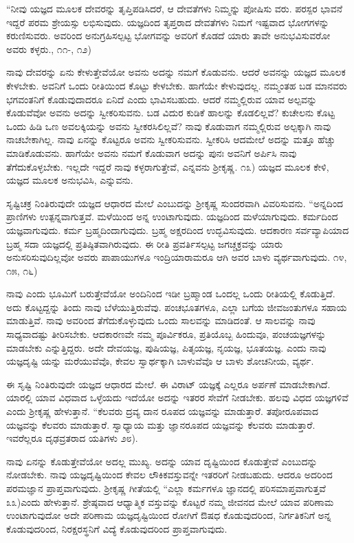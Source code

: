 “ನೀವು ಯಜ್ಞದ ಮೂಲಕ ದೇವರನ್ನು ತೃಪ್ತಿಪಡಿಸಿದರೆ, ಆ ದೇವತೆಗಳು ನಿಮ್ಮನ್ನು ಪೋಷಿಸು ವರು. ಪರಸ್ಪರ ಭಾವನೆ ಇದ್ದರೆ ಪರಮ ಶ್ರೇಯಸ್ಸು ಲಭಿಸುವುದು. ಯಜ್ಞದಿಂದ ತೃಪ್ತರಾದ ದೇವತೆಗಳು ನಿಮಗೆ ಇಷ್ಟವಾದ ಭೋಗಗಳನ್ನು ಕರುಣಿಸುವರು. ಅವರಿಂದ ಅನುಗ್ರಹಿಸಲ್ಪಟ್ಟ ಭೋಗವನ್ನು ಅವರಿಗೆ ಕೊಡದೆ ಯಾರು ತಾವೇ ಅನುಭವಿಸುವರೋ ಅವರು ಕಳ್ಳರು., ೧೧-, ೧೨)

ನಾವು ದೇವರನ್ನು ಏನು ಕೇಳುತ್ತೇವೆಯೋ ಅವನು ಅದನ್ನು ನಮಗೆ ಕೊಡುವನು. ಆದರೆ ಅವನನ್ನು ಯಜ್ಞದ ಮೂಲಕ ಕೇಳಬೇಕು. ಅವನಿಗೆ ಒಂದು ರೀತಿಯಿಂದ ಕೊಟ್ಟು ಕೇಳಬೇಕು. ಹಾಗೆಯೇ ಕೇಳುವುದಲ್ಲ. ನಮ್ಮಂತಹ ಬಡ ಮಾನವರು ಭಗವಂತನಿಗೆ ಕೊಡುವುದಾದರೂ ಏನಿದೆ ಎಂದು ಭಾವಿಸಬಹುದು. ಆದರೆ ನಮ್ಮಲ್ಲಿರುವ ಯಾವ ಅಲ್ಪವನ್ನು ಕೊಡುವೆವೋ ಅವನು ಅದನ್ನು ಸ್ವೀಕರಿಸುವನು. ಬಡ ವಿದುರ ಕುಡಿಕೆ ಹಾಲನ್ನು ಕೊಡಲಿಲ್ಲವೆ? ಕುಚೇಲನು ಕೊಟ್ಟ ಒಂದು ಹಿಡಿ ಒಣ ಅವಲಕ್ಕಿಯನ್ನು ಅವನು ಸ್ವೀಕರಸಿಲಿಲ್ಲವೆ? ನಾವು ಕೊಡುವಾಗ ನಮ್ಮಲ್ಲಿರುವ ಅಲ್ಪಕ್ಕಾಗಿ ನಾವು ನಾಚಬೇಕಾಗಿಲ್ಲ. ನಾವು ಏನನ್ನು ಕೊಟ್ಟರೂ ಅವನು ಸ್ವೀಕರಿಸುವನು. ಸ್ವೀಕರಿಸಿ ಆದಮೇಲೆ ಅದನ್ನು ಮತ್ತೂ ಹೆಚ್ಚು ಮಾಡಿಕೊಡುವನು. ಹಾಗೆಯೇ ಅವನು ನಮಗೆ ಕೊಡುವಾಗ ಅದನ್ನು ಪುನಃ ಅವನಿಗೆ ಅರ್ಪಿಸಿ ನಾವು ತೆಗೆದುಕೊಳ್ಳಬೇಕು. ಇಲ್ಲದೇ ಇದ್ದರೆ ನಾವು ಕಳ್ಳರಾಗುತ್ತೇವೆ, ಎನ್ನವನು ಶ್ರೀಕೃಷ್ಣ. ೧೩) ಯಜ್ಞದ ಮೂಲಕ ಕೇಳಿ, ಯಜ್ಞದ ಮೂಲಕ ಅನುಭವಿಸಿ, ಎನ್ನುವನು.

ಸೃಷ್ಟಿಚಕ್ರ ನಿಂತಿರುವುದೇ ಯಜ್ಞದ ಆಧಾರದ ಮೇಲೆ ಎಂಬುದನ್ನು ಶ್ರೀಕೃಷ್ಣ ಸುಂದರವಾಗಿ ವಿವರಿಸುವನು. “ಅನ್ನದಿಂದ ಪ್ರಾಣಿಗಳು ಉತ್ಪನ್ನವಾಗುತ್ತವೆ. ಮಳೆಯಿಂದ ಅನ್ನ ಉಂಟಾಗುವುದು. ಯಜ್ಞದಿಂದ ಮಳೆಯಾಗುವುದು. ಕರ್ಮದಿಂದ ಯಜ್ಞವಾಗುವುದು. ಕರ್ಮ ಬ್ರಹ್ಮದಿಂದಾಗುವುದು. ಬ್ರಹ್ಮ ಅಕ್ಷರದಿಂದ ಉದ್ಭವಿಸುವುದು. ಆದಕಾರಣ ಸರ್ವವ್ಯಾಪಿಯಾದ ಬ್ರಹ್ಮ ಸದಾ ಯಜ್ಞದಲ್ಲಿ ಪ್ರತಿಷ್ಠಿತವಾಗಿರುವುದು. ಈ ರೀತಿ ಪ್ರವರ್ತಿಸಲ್ಪಟ್ಟ ಜಗಚ್ಚಕ್ರವನ್ನು ಯಾರು ಅನುಸರಿಸುವುದಿಲ್ಲವೋ ಅವರು ಪಾಪಾಯುಗಳೂ ಇಂದ್ರಿಯಾರಾಮರೂ ಆಗಿ ಅವರ ಬಾಳು ವ್ಯರ್ಥವಾಗುವುದು.  ೧೪, ೧೫, ೧೬)

ನಾವು ಎಂದು ಭೂಮಿಗೆ ಬರುತ್ತೇವೆಯೋ ಅಂದಿನಿಂದ ಇಡೀ ಬ್ರಹ್ಮಾಂಡ ಒಂದಲ್ಲ ಒಂದು ರೀತಿಯಲ್ಲಿ ಕೊಡುತ್ತಿದೆ. ಅದು ಕೊಟ್ಟದ್ದನ್ನು ತಿಂದು ನಾವು ಬೆಳೆಯುತ್ತಿರುವೆವು. ಪಂಚಭೂತಗಳೂ, ಎಲ್ಲಾ ಬಗೆಯ ಜೀವಜಂತುಗಳೂ ಸಹಾಯ ಮಾಡುತ್ತಿವೆ. ನಾವು ಅವರಿಂದ ತೆಗೆದುಕೊಳ್ಳುವುದು ಒಂದು ಸಾಲವನ್ನು ಮಾಡಿದಂತೆ. ಆ ಸಾಲವನ್ನು ನಾವು ಸಾಧ್ಯವಾದಷ್ಟು ತೀರಿಸಬೇಕು. ಆದಕಾರಣವೇ ನಮ್ಮ ಪೂರ್ವಿಕರೂ, ಪ್ರತಿಯೊಬ್ಬ ಹಿಂದುವೂ, ಪಂಚಯಜ್ಞಗಳನ್ನು ಮಾಡಬೇಕು ಎನ್ನುತ್ತಿದ್ದರು. ಅದೇ ದೇವಯಜ್ಞ, ಪುಷಿಯಜ್ಞ, ಪಿತೃಯಜ್ಞ, ನೃಯಜ್ಞ, ಭೂತಯಜ್ಞ. ಎಂದು ನಾವು ಯಜ್ಞದೃಷ್ಟಿ ಯನ್ನು ಮರೆಯುವೆವೊ, ಕೇವಲ ಸ್ವಾರ್ಥಕ್ಕಾಗಿ ಬಾಳುವೆವೊ ಆ ಬಾಳು ಶೋಚನೀಯ, ವ್ಯರ್ಥ.

ಈ ಸೃಷ್ಟಿ ನಿಂತಿರುವುದೇ ಯಜ್ಞದ ಆಧಾರದ ಮೇಲೆ. ಈ ವಿರಾಟ್ ಯಜ್ಞಕ್ಕೆ ಎಲ್ಲರೂ ಅರ್ಪಣೆ ಮಾಡಬೇಕಾಗಿದೆ. ಯಾರಲ್ಲಿ ಯಾವ ವಿಧವಾದ ಒಳ್ಳೆಯದು ಇದೆಯೋ ಅದನ್ನು ಇತರರ ಸೇವೆಗೆ ನೀಡಬೇಕು. ಹಲವು ವಿಧದ ಯಜ್ಞಗಳಿವೆ ಎಂದು ಶ್ರೀಕೃಷ್ಣ ಹೇಳುತ್ತಾನೆ. “ಕೆಲವರು ದ್ರವ್ಯ ದಾನ ರೂಪದ ಯಜ್ಞವನ್ನು ಮಾಡುತ್ತಾರೆ. ತಪೋರೂಪವಾದ ಯಜ್ಞವನ್ನು ಕೆಲವರು ಮಾಡುತ್ತಾರೆ. ಸ್ವಾಧ್ಯಾಯ ಮತ್ತು ಜ್ಞಾನರೂಪದ ಯಜ್ಞವನ್ನು ಕೆಲವರು ಮಾಡುತ್ತಾರೆ. ಇವರೆಲ್ಲರೂ ದೃಢವ್ರತರಾದ ಯತಿಗಳು ೨೮).

ನಾವು ಏನನ್ನು ಕೊಡುತ್ತೇವೆಯೋ ಅದಲ್ಲ ಮುಖ್ಯ. ಅದನ್ನು ಯಾವ ದೃಷ್ಟಿಯಿಂದ ಕೊಡುತ್ತೇವೆ ಎಂಬುದನ್ನು ನೋಡಬೇಕು. ನಾವು ಯಜ್ಞದೃಷ್ಟಿಯಿಂದ ಕೇವಲ ಲೌಕಿಕವಸ್ತುವನ್ನೇ ಇತರರಿಗೆ ನೀಡಬಹುದು. ಆದರೂ ಅದರಿಂದ ಪರಮಜ್ಞಾನ ಪ್ರಾಪ್ತವಾಗುವುದು. ಶ್ರೀಕೃಷ್ಣ ಗೀತೆಯಲ್ಲಿ “ಎಲ್ಲಾ ಕರ್ಮಗಳೂ ಜ್ಞಾನದಲ್ಲಿ ಪರಿಸಮಾಪ್ತವಾಗುತ್ತವೆ ೩೩)ಎಂದು ಹೇಳುತ್ತಾನೆ. ಶ್ರೇಷ್ಠವಾದ ಆಧ್ಯಾತ್ಮಿಕ ವಸ್ತುವನ್ನು ಕೊಟ್ಟರೆ ನಮ್ಮ ಜೀವನದ ಮೇಲೆ ಯಾವ ಪರಿಣಾಮ ಉಂಟಾಗುವುದೋ ಅದೇ ಪರಿಣಾಮ ಯಜ್ಞದೃಷ್ಟಿಯಿಂದ ರೋಗಿಗೆ ಔಷಧ ಕೊಡುವುದರಿಂದ, ನಿರ್ಗತಿಕನಿಗೆ ಅನ್ನ ಕೊಡುವುದರಿಂದ, ನಿರಕ್ಷರಸ್ಥನಿಗೆ ವಿದ್ಯೆ ಕೊಡುವುದರಿಂದ ಪ್ರಾಪ್ತವಾಗುವುದು.

